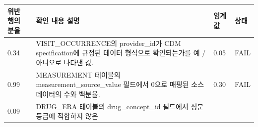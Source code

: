 \documentclass[11pt]{book}
\theoremstyle{definition}
\theoremstyle{definition}
\theoremstyle{definition}
\theoremstyle{remark}
\begin{document}
\begin{longtable}[]{@{}llll@{}}
\toprule
\begin{minipage}[b]{0.12\columnwidth}\raggedright\strut
위반 행의 분율\strut
\end{minipage} & \begin{minipage}[b]{0.47\columnwidth}\raggedright\strut
확인 내용 설명\strut
\end{minipage} & \begin{minipage}[b]{0.10\columnwidth}\raggedright\strut
임계값\strut
\end{minipage} & \begin{minipage}[b]{0.07\columnwidth}\raggedright\strut
상태\strut
\end{minipage}\tabularnewline
\midrule
\endhead
\begin{minipage}[t]{0.12\columnwidth}\raggedright\strut
0.34\strut
\end{minipage} & \begin{minipage}[t]{0.47\columnwidth}\raggedright\strut
VISIT\_OCCURRENCE의 provider\_id가 CDM specification에 규정된 데이터
형식으로 확인되는가를 예 / 아니오로 나타낸 값.\strut
\end{minipage} & \begin{minipage}[t]{0.10\columnwidth}\raggedright\strut
0.05\strut
\end{minipage} & \begin{minipage}[t]{0.07\columnwidth}\raggedright\strut
FAIL\strut
\end{minipage}\tabularnewline
\begin{minipage}[t]{0.12\columnwidth}\raggedright\strut
0.99\strut
\end{minipage} & \begin{minipage}[t]{0.47\columnwidth}\raggedright\strut
MEASUREMENT 테이블의 measurement\_source\_value 필드에서 0으로 매핑된
소스 데이터의 수와 백분율.\strut
\end{minipage} & \begin{minipage}[t]{0.10\columnwidth}\raggedright\strut
0.30\strut
\end{minipage} & \begin{minipage}[t]{0.07\columnwidth}\raggedright\strut
FAIL\strut
\end{minipage}\tabularnewline
\begin{minipage}[t]{0.12\columnwidth}\raggedright\strut
0.09\strut
\end{minipage} & \begin{minipage}[t]{0.47\columnwidth}\raggedright\strut
DRUG\_ERA 테이블의 drug\_concept\_id 필드에서 성분 등급에 적합하지 않은

\end{minipage}
\end{longtable}
\end{document}

